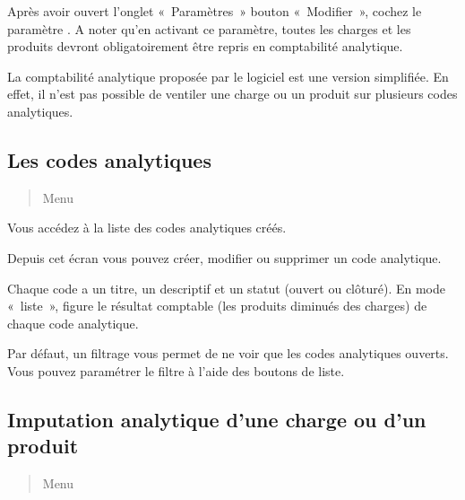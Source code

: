 \documentclass[a4paper,10pt,oneside,french]{sphinxmanual}
\begin{document}
\sphinxAtStartPar
Après avoir ouvert l’onglet « Paramètres » \sphinxhyphen{} bouton « Modifier », cochez le paramètre . A noter qu’en activant ce paramètre, toutes les charges et les produits devront obligatoirement être repris en comptabilité analytique.

\sphinxAtStartPar
La comptabilité analytique proposée par le logiciel est une version simplifiée. En effet, il n’est pas possible de ventiler une charge ou un produit sur plusieurs codes analytiques.


\subsection{Les codes analytiques}
\label{\detokenize{accounting/costaccounting:les-codes-analytiques}}\begin{quote}

\sphinxAtStartPar
Menu 
\end{quote}

\sphinxAtStartPar
Vous accédez à la liste des codes analytiques créés.

\sphinxAtStartPar
Depuis cet écran vous pouvez créer, modifier ou supprimer un code analytique.

\sphinxAtStartPar
Chaque code a un titre, un descriptif et un statut (ouvert ou clôturé).
En mode « liste », figure le résultat comptable (les produits diminués des charges) de chaque code analytique.
\begin{quote}

\noindent{}
\end{quote}

\sphinxAtStartPar
Par défaut, un filtrage vous permet de ne voir que  les codes analytiques ouverts. Vous pouvez paramétrer le filtre à l’aide des boutons de liste.


\subsection{Imputation analytique d’une charge ou d’un produit}
\label{\detokenize{accounting/costaccounting:imputation-analytique-d-une-charge-ou-d-un-produit}}\begin{quote}

\sphinxAtStartPar
Menu 
\end{quote}
\end{document}
